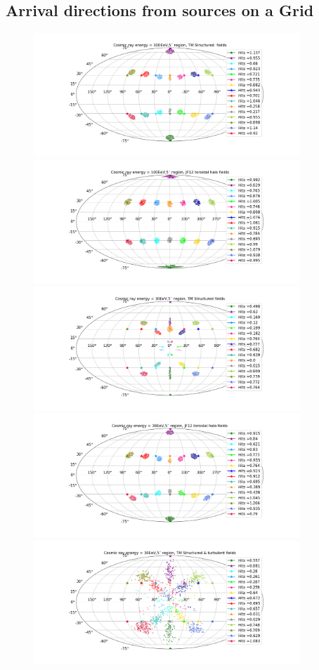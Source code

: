 \documentclass[12pt, a4 paper]{article}
\begin{document}
\subsection{Arrival directions from sources on a Grid}
\begin{figure}[h!]
    \centering
    \includegraphics[width = 10cm]{Images/Str_TM_particles1e5_100EeV (1).png}%
    \includegraphics[width=10cm]{Images/JF12_TorH_particles1e5_100EeV (1).png}
    \includegraphics[width = 10cm]{Images/Str_TM_particles1e5_30EeV (1).png}%
    \includegraphics[width = 10cm]{Images/JF12_TorH_particles1e5_30EeV (1).png}
    \includegraphics[width = 10cm]{Images/Tur_Str_TM_particles1e5_30EeV (1).png}%

\end{figure}
\end{document}
